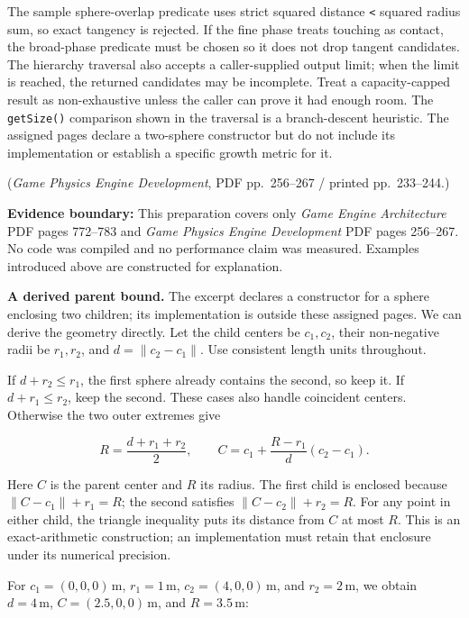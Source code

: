 The sample sphere-overlap predicate uses strict squared distance \texttt{\textless{}} squared radius sum, so exact tangency is rejected. If the fine phase treats touching as contact, the broad-phase predicate must be chosen so it does not drop tangent candidates. The hierarchy traversal also accepts a caller-supplied output limit; when the limit is reached, the returned candidates may be incomplete. Treat a capacity-capped result as non-exhaustive unless the caller can prove it had enough room. The \texttt{getSize()} comparison shown in the traversal is a branch-descent heuristic. The assigned pages declare a two-sphere constructor but do not include its implementation or establish a specific growth metric for it.

(\emph{Game Physics Engine Development}, PDF pp.~256--267 / printed pp.~233--244.)

\textbf{Evidence boundary:} This preparation covers only \emph{Game Engine Architecture} PDF pages 772--783 and \emph{Game Physics Engine Development} PDF pages 256--267. No code was compiled and no performance claim was measured. Examples introduced above are constructed for explanation.

\textbf{A derived parent bound.} The excerpt declares a constructor for a sphere enclosing two children; its implementation is outside these assigned pages. We can derive the geometry directly. Let the child centers be \(c_1,c_2\), their non-negative radii be \(r_1,r_2\), and \(d=\lVert c_2-c_1\rVert\). Use consistent length units throughout.

If \(d+r_2\leq r_1\), the first sphere already contains the second, so keep it. If \(d+r_1\leq r_2\), keep the second. These cases also handle coincident centers. Otherwise the two outer extremes give

\[
R=\frac{d+r_1+r_2}{2},\qquad
C=c_1+\frac{R-r_1}{d}(c_2-c_1).
\]

Here \(C\) is the parent center and \(R\) its radius. The first child is enclosed because \(\lVert C-c_1\rVert+r_1=R\); the second satisfies \(\lVert C-c_2\rVert+r_2=R\). For any point in either child, the triangle inequality puts its distance from \(C\) at most \(R\). This is an exact-arithmetic construction; an implementation must retain that enclosure under its numerical precision.

For \(c_1=(0,0,0)\,\mathrm m\), \(r_1=1\,\mathrm m\), \(c_2=(4,0,0)\,\mathrm m\), and \(r_2=2\,\mathrm m\), we obtain \(d=4\,\mathrm m\), \(C=(2.5,0,0)\,\mathrm m\), and \(R=3.5\,\mathrm m\):

